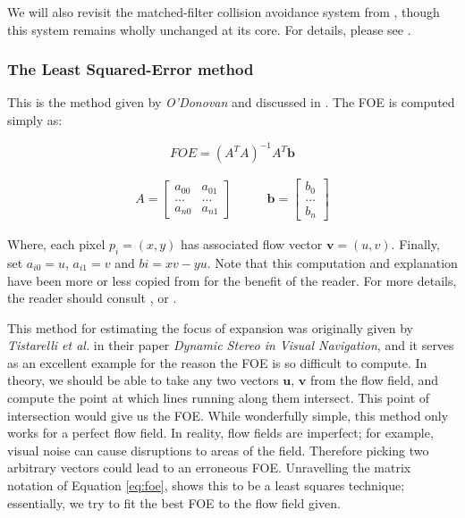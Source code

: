 \documentclass[a4paper,11pt,twoside,openright]{article}
\begin{document}
We will also revisit the matched-filter collision avoidance system from
\cite{Mitchell2018}, though this system remains wholly unchanged at its core. For
details, please see \cite{Mitchell2018}.

\subsubsection{The Least Squared-Error method}
This is the method given by \textit{O'Donovan} and discussed in
\cite{Mitchell2018}. The FOE is computed simply as:

\begin{equation}
  \label{eq:foe}
  FOE = (A^TA)^{-1}A^T\mathbf{b}
\end{equation}

\begin{equation*}
  \begin{split}
 A =
\begin{bmatrix}
  a_{00} & a_{01}\\
  \dots  & \dots \\
  a_{n0} &  a_{n1}
\end{bmatrix}
\qquad
\end{split}
\begin{split}
\mathbf{b} =
\begin{bmatrix}
  b_0 \\
  \dots \\
  b_n
\end{bmatrix}
\end{split}
\end{equation*}
\newline

Where, each pixel $p_i = (x, y)$ has associated flow vector $\mathbf{v} = (u,v)$.
Finally, set $a_{i0} = u$, $a_{i1} = v$ and $b{i} = xv - yu$. Note that this
computation and explanation have been more or less copied from
\cite{Mitchell2018} for the benefit of the reader. For more details, the reader
should consult \cite{Mitchell2018}, or \cite{ODonovan2005}.
\newline
\par

This method for estimating the focus of expansion was originally given by
\textit{Tistarelli et al.} in their paper
\textit{Dynamic Stereo in Visual Navigation}\cite{Tistarelli1991, ODonovan2005},
and it serves as an excellent example for the reason the FOE is so difficult to
compute. In theory, we should be able to take any two vectors $\mathbf{u}$,
$\mathbf{v}$ from the flow field, and compute the point at which lines
running along them intersect. This point of intersection would give us the
FOE\cite{ODonovan2005}. While wonderfully simple, this method only works for
a perfect flow field. In reality, flow fields are imperfect; for example,
visual noise can cause disruptions to areas of the field. Therefore picking two
arbitrary vectors could lead to an erroneous FOE. Unravelling the matrix notation
of Equation \ref{eq:foe}, shows this to be a least squares technique;
essentially, we try to fit the best FOE to the flow field given.
\end{document}
